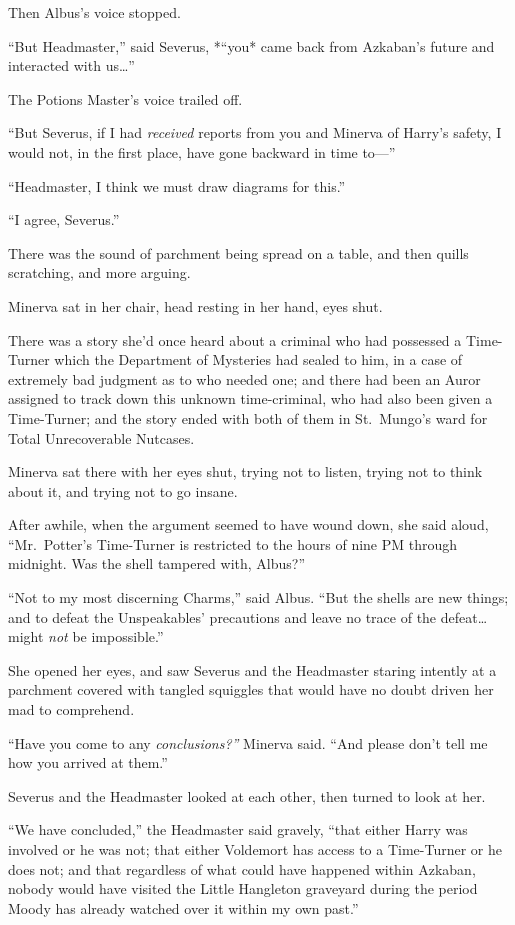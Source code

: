 Then Albus's voice stopped.

``But Headmaster,'' said Severus, *``you* came back from Azkaban's
future and interacted with us\ldots{}''

The Potions Master's voice trailed off.

``But Severus, if I had \emph{received} reports from you and Minerva of
Harry's safety, I would not, in the first place, have gone backward in
time to---''

``Headmaster, I think we must draw diagrams for this.''

``I agree, Severus.''

There was the sound of parchment being spread on a table, and then
quills scratching, and more arguing.

Minerva sat in her chair, head resting in her hand, eyes shut.

There was a story she'd once heard about a criminal who had possessed a
Time-Turner which the Department of Mysteries had sealed to him, in a
case of extremely bad judgment as to who needed one; and there had been
an Auror assigned to track down this unknown time-criminal, who had also
been given a Time-Turner; and the story ended with both of them in
St.~Mungo's ward for Total Unrecoverable Nutcases.

Minerva sat there with her eyes shut, trying not to listen, trying not
to think about it, and trying not to go insane.

After awhile, when the argument seemed to have wound down, she said
aloud, ``Mr.~Potter's Time-Turner is restricted to the hours of nine PM
through midnight. Was the shell tampered with, Albus?''

``Not to my most discerning Charms,'' said Albus. ``But the shells are
new things; and to defeat the Unspeakables' precautions and leave no
trace of the defeat\ldots{} might \emph{not} be impossible.''

She opened her eyes, and saw Severus and the Headmaster staring intently
at a parchment covered with tangled squiggles that would have no doubt
driven her mad to comprehend.

``Have you come to any \emph{conclusions?''} Minerva said. ``And please
don't tell me how you arrived at them.''

Severus and the Headmaster looked at each other, then turned to look at
her.

``We have concluded,'' the Headmaster said gravely, ``that either Harry
was involved or he was not; that either Voldemort has access to a
Time-Turner or he does not; and that regardless of what could have
happened within Azkaban, nobody would have visited the Little Hangleton
graveyard during the period Moody has already watched over it within my
own past.''

